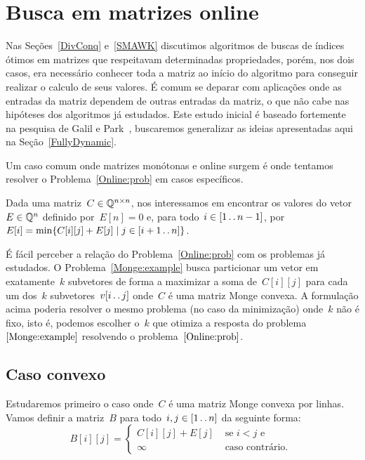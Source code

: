 \section{Busca em matrizes online}
\label{Online}

Nas Seções~\ref{DivConq} e~\ref{SMAWK} discutimos algoritmos de buscas de índices ótimos em matrizes que respeitavam determinadas propriedades, porém, nos dois casos, era necessário conhecer toda a matriz ao início do algoritmo para conseguir realizar o calculo de seus valores. É comum se deparar com aplicações onde as entradas da matriz dependem de outras entradas da matriz, o que não cabe nas hipóteses dos algoritmos já estudados. Este estudo inicial é baseado fortemente na pesquisa de Galil e Park~\cite{Galil:1992}, buscaremos generalizar as ideias apresentadas aqui na Seção~\ref{FullyDynamic}.

Um caso comum onde matrizes monótonas e online surgem é onde tentamos resolver o Problema~\ref{Online:prob} em casos específicos.

\begin{prob} \label{Online:prob}
Dada uma matriz~$C \in \mathbb{Q}^{n \times n}$, nos interessamos em encontrar os valores do vetor~$E \in \mathbb{Q}^{n}$ definido por~$E[n] = 0$ e, para todo~$i \in [1 \,.\,.\, n-1]$, por~${E[i] = \min\{ C[i][j] + E[j] \mid j \in [i+1 \,.\,.\, n]\}}$.
\end{prob}

É fácil perceber a relação do Problema~\ref{Online:prob} com os problemas já estudados. O Problema~\ref{Monge:example} busca particionar um vetor em exatamente~$k$ subvetores de forma a maximizar a soma de~$C[i][j]$ para cada um dos~$k$ subvetores~$v[i \,.\,.\, j]$ onde~$C$ é uma matriz Monge convexa. A formulação acima poderia resolver o mesmo problema (no caso da minimização) onde~$k$ não é fixo, isto é, podemos escolher o~$k$ que otimiza a resposta do problema~$\ref{Monge:example}$ resolvendo o problema~$\ref{Online:prob}$.


\subsection{Caso convexo}

Estudaremos primeiro o caso onde~$C$ é uma matriz Monge convexa por linhas. Vamos definir a matriz~$B$ para todo~$i,j \in [1 \,.\,.\, n]$ da seguinte forma:
\begin{equation}
B[i][j] = \begin{cases}
    C[i][j] + E[j] & \text{ se } i < j \text{ e } \\
    \infty         & \text{ caso contrário. } 
\end{cases}
\end{equation}

